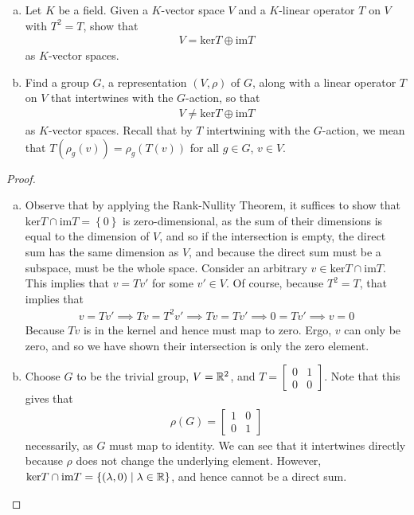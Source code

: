 \documentclass[num=4,duedate=03-03-21,course=Algebra\ II,proflastname=Walton]{hwtemplate}
\begin{document}
\problem[2]
\begin{claim}
	\begin{enumerate}[(a).]
		\item Let \(K\) be a field. Given a \(K\)-vector space \(V\) and a \(K\)-linear operator \(T\) on \(V\) with \(T^2=T\), show that
			\begin{align*}
				V = \textrm{ker}T \oplus \textrm{im}T
			\end{align*}
			as \(K\)-vector spaces.
		\item Find a group \(G\), a representation \((V,\rho)\) of \(G\), along with a linear operator \(T\) on \(V\) that intertwines with the \(G\)-action, so that
			\begin{align*}
				V \neq \textrm{ker}T \oplus \textrm{im}T
			\end{align*}
			as \(K\)-vector spaces. Recall that by \(T\) intertwining with the \(G\)-action, we mean that \(T(\rho_g(v)) = \rho_g(T(v))\) for all \(g \in G\), \(v \in V\).
	\end{enumerate}
\end{claim}
\begin{proof}
	\begin{enumerate}[(a).]
		\item Observe that by applying the Rank-Nullity Theorem, it suffices to show that \(\textrm{ker}T \cap \textrm{im}T = \left\{ 0 \right\} \) is zero-dimensional, as the sum of their dimensions is equal to the dimension of \(V\), and so if the intersection is empty, the direct sum has the same dimension as \(V\), and because the direct sum must be a subspace, must be the whole space. Consider an arbitrary \(v \in \textrm{ker}T \cap \textrm{im}T\). This implies that \(v = Tv'\) for some \(v' \in V\). Of course, because \(T^2=T\), that implies that
			\begin{align*}
			v = Tv' \implies Tv = T^2v' \implies Tv = Tv' \implies 0 = Tv' \implies v = 0
			\end{align*}
			Because \(Tv\) is in the kernel and hence must map to zero. Ergo, \(v\) can only be zero, and so we have shown their intersection is only the zero element.
		\item Choose \(G\) to be the trivial group, \(V = \mathbb{R}^2\), and \(T = \begin{bmatrix} 0 & 1 \\ 0 & 0 \end{bmatrix} \). Note that this gives that
			\begin{align*}
				\rho(G) = \begin{bmatrix} 1 & 0 \\ 0 &1 \end{bmatrix} 
			\end{align*}
			necessarily, as \(G\) must map to identity. We can see that it intertwines directly because \(\rho\) does not change the underlying element. However, \(\textrm{ker}T \cap \textrm{im}T = \left\{ (\lambda,0) \mid \lambda \in \mathbb{R} \right\} \), and hence cannot be a direct sum.
	\end{enumerate}
\end{proof}
\separator
\end{document}
